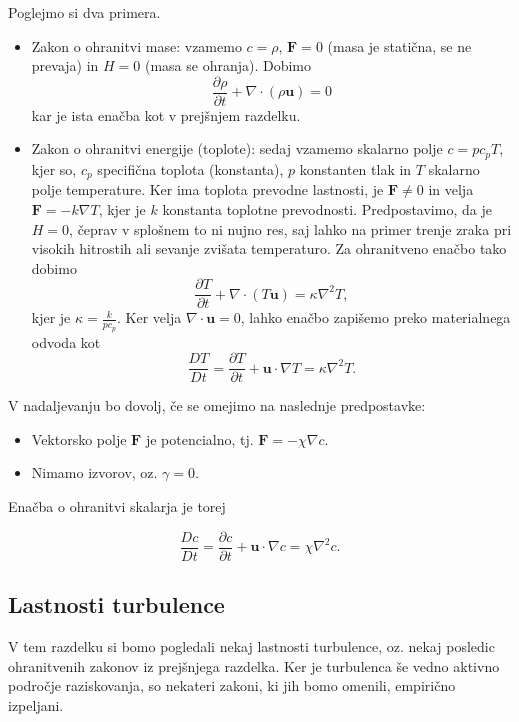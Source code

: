 \documentclass[mat2, tisk]{fmfdelo}
\newcommand{\bd}{\textbf}
\begin{document}
Poglejmo si dva primera.
\begin{primer}
  \hfil
\begin{itemize}
  \item Zakon o ohranitvi mase: vzamemo $c = \rho$, $\bd{F} = 0$ (masa je statična, se ne prevaja) in 
  $H = 0$ (masa se ohranja). Dobimo
  $$
  \frac{\partial \rho}{\partial t} + \nabla \cdot (\rho \bd{u}) = 0
  $$
  kar je ista enačba kot v prejšnjem razdelku.
  \item Zakon o ohranitvi energije (toplote): sedaj vzamemo skalarno polje $c = pc_p T$, kjer 
  so, $c_p$ specifična toplota (konstanta), $p$ konstanten tlak in $T$ skalarno polje temperature. 
  Ker ima toplota prevodne lastnosti, je $\bd{F} \neq 0$ in velja $\bd{F} = -k\nabla T$, kjer je 
  $k$ konstanta toplotne prevodnosti. Predpostavimo, da je $H = 0$, čeprav v splošnem to 
  ni nujno res, saj lahko na primer trenje zraka pri visokih hitrostih ali sevanje 
  zvišata temperaturo. Za ohranitveno enačbo tako dobimo 
  \begin{equation*}
  \frac{\partial T}{\partial t} + \nabla \cdot (T \bd{u}) = \kappa \nabla^2 T,
  \end{equation*}
  kjer je $\kappa = \frac{k}{p c_p}$.
  Ker velja  $\nabla \cdot \bd{u} = 0$, lahko enačbo zapišemo preko materialnega odvoda kot
  \begin{equation*}
  \frac{D T}{D t} = \frac{\partial T}{\partial t} + \bd{u}\cdot\nabla T = \kappa \nabla^2 T.
  \end{equation*}
\end{itemize}
\end{primer}
V nadaljevanju bo dovolj, če se omejimo na naslednje predpostavke:
\begin{itemize}
  \item Vektorsko polje $\bd{F}$ je potencialno, tj. $\bd{F} = - \chi \nabla c$. 
  \item Nimamo izvorov, oz. $\gamma = 0$.
\end{itemize}
Enačba o ohranitvi skalarja je torej

\begin{equation*}
\frac{D c}{D t} = \frac{\partial c}{\partial t} + \bd{u}\cdot\nabla c = \chi \nabla^2 c.
\end{equation*}

\subsection{Lastnosti turbulence}
V tem razdelku si bomo pogledali nekaj lastnosti turbulence, oz. nekaj posledic 
ohranitvenih zakonov iz prejšnjega razdelka. Ker je turbulenca še vedno aktivno
področje raziskovanja, so nekateri zakoni, ki jih bomo omenili, empirično izpeljani.
\end{document}

